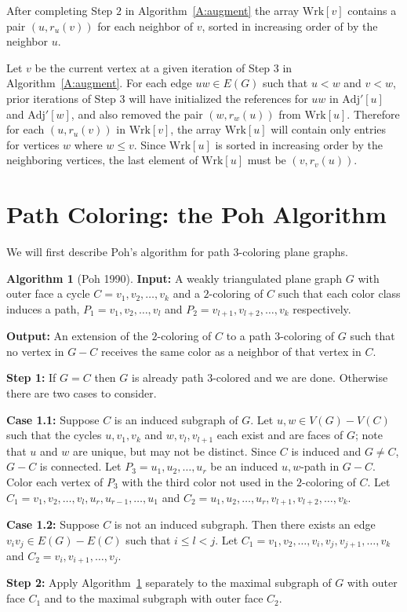 \documentclass[12pt,letterpaper]{article}
\theoremstyle{plain}
\theoremstyle{definition}
\theoremstyle{break}
\newtheorem{algorithm}[lemma]{Algorithm}     %
\begin{document}
After completing Step $2$ in Algorithm~\ref{A:augment} the array $\text{Wrk}[v]$ contains
a pair $(u,r_u(v))$ for each neighbor of $v$, sorted in increasing order of by
the neighbor $u$.

Let $v$ be the current vertex at a given iteration of Step $3$ in
Algorithm~\ref{A:augment}. For each edge $uw\in E(G)$ such that
$u<w$ and $v<w$, prior iterations of Step 3 will have initialized the
references for $uw$ in $\text{Adj}'[u]$ and $\text{Adj}'[w]$, and also removed the pair
$(w,r_w(u))$ from $\text{Wrk}[u]$. Therefore for each $(u,r_u(v))$ in
$\text{Wrk}[v]$, the array $\text{Wrk}[u]$ will contain only entries for
vertices $w$ where $w\le v$. Since $\text{Wrk}[u]$ is sorted in
increasing order by the neighboring vertices, the last element of
$\text{Wrk}[u]$ must be $(v,r_v(u))$.

\section{Path Coloring: the Poh Algorithm}

We will first describe Poh's algorithm for path $3$-coloring plane graphs.

\begin{algorithm}[Poh 1990]\label{A:planar3}
\textbf{Input:} A weakly triangulated plane graph $G$ with outer face a
cycle $C=v_1,v_2,\ldots, v_k$ and a $2$-coloring of $C$ such
that each color class induces a path, $P_1=v_1,v_2,\ldots, v_l$ and
$P_2=v_{l+1},v_{l+2},\ldots, v_k$ respectively.

\noindent\textbf{Output:} An extension of the $2$-coloring of $C$ to a path
$3$-coloring of $G$ such that no vertex in $G-C$ receives the same color as a
neighbor of that vertex in $C$.

\noindent\textbf{Step 1:} If $G=C$ then $G$ is already path $3$-colored and we
are done. Otherwise there are two cases to consider.

\noindent\textbf{Case 1.1:} Suppose $C$ is an induced subgraph of $G$. Let
$u,w\in V(G)-V(C)$ such that the cycles $u,v_1,v_k$ and $w,v_l,v_{l+1}$ each
exist and are faces of $G$; note that
$u$ and $w$ are unique, but may not be distinct. Since $C$ is induced and
$G\ne C$, $G-C$ is connected.
Let $P_3=u_1,u_2,\ldots,u_r$ be an induced $u,w$-path in $G-C$.
Color each vertex of $P_3$ with the third color not used in the $2$-coloring of
$C$. Let $C_1=v_1,v_2,\ldots,v_l,u_r,u_{r-1},\ldots,u_1$ and
$C_2=u_1,u_2,\ldots,u_r,v_{l+1},v_{l+2},\ldots,v_k$.

\noindent\textbf{Case 1.2:} Suppose $C$ is not an induced subgraph. Then there
exists an edge $v_iv_j\in E(G)-E(C)$ such that $i\le l < j$. Let
$C_1=v_1,v_2,\ldots,v_i,v_j,v_{j+1},\ldots,v_k$
and $C_2=v_i,v_{i+1},\ldots,v_j$.

\noindent\textbf{Step 2:} Apply Algorithm~\ref{A:planar3} separately to the
maximal subgraph of $G$ with outer face $C_1$ and to the maximal subgraph with outer face
$C_2$.
\end{algorithm}
\end{document}

